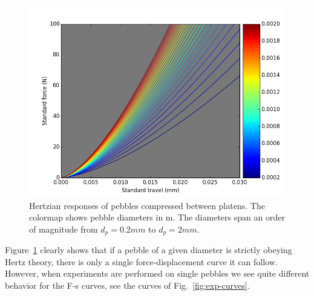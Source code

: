 \begin{figure}[ht!]
\centering
\includegraphics[width = 0.75 \textwidth]{chapters/figures/hertz-dp-dependence}
\caption{Hertzian responses of \lit pebbles compressed between platens. The colormap shows pebble diameters in \si{m}. The diameters span an order of magnitude from $d_p = \si{0.2 mm}$ to $d_p = \si{2 mm}$.}\label{fig:hertz-dp-dependence}
\end{figure}

Figure~\ref{fig:hertz-dp-dependence} clearly shows that if a pebble of a given diameter is strictly obeying Hertz theory, there is only a single force-displacement curve it can follow. However, when experiments are performed on single pebbles we see quite different behavior for the F-s curves, see the curves of Fig.~\ref{fig:exp-curves}. 

